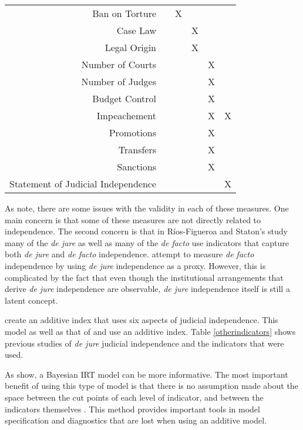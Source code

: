 \documentclass[JohnsonMADraft2.tex]{subfiles}
\begin{document}
\begin{landscape}
\begin{table}[!tbh]
\begin{tabular}{rccccc}
			Ban on Torture	&		&	X	&		&		&		\\
			Case Law	&		&		&	X	&		&		\\
			Legal Origin	&		&		&	X	&		&		\\
			Number of Courts	&		&		&		&	X	&		\\
			Number of Judges	&		&		&		&	X	&		\\
			Budget Control	&		&		&		&	X	&		\\
			Impeachement	&		&		&		&	X	&	X	\\
			Promotions	&		&		&		&	X	&		\\
			Transfers	&		&		&		&	X	&		\\
			Sanctions	&		&		&		&	X	&		\\
			Statement of Judicial Independence	&		&		&		&		&	X	\\\hline
		\end{tabular}
	\end{table}
\end{landscape}
\restoregeometry

\doublespacing\normalsize
As \citet{Rios2014} note, there are some issues with the validity in each of these measures.  One main concern is that some of these measures are not directly related to independence.  The second concern is that in R\'{i}os-Figueroa and Staton's study many of the \textit{de jure} as well as many of the \textit{de facto} use indicators that capture both \textit{de jure} and \textit{de facto} independence.  \citealt{Laporta2004} attempt to measure \textit{de facto} independence by using \textit{de jure} independence as a proxy.  However, this is complicated by the fact that even though the institutional arrangements that derive \textit{de jure} independence are observable, \textit{de jure} independence itself is still a latent concept. 

\citet*{Melton2014} create an additive index that uses six aspects of judicial independence.  This model as well as that of \citet*{Feld2003} and \citet*{Keith2002b} use an additive index.  Table \ref{otherindicators} shows previous studies of \textit{de jure} judicial independence and the indicators that were used.   

As \citet{Linzer2014} show, a Bayesian IRT model can be more informative.  The most important benefit of using this type of model is that there is no assumption made about the space between the cut points of each level of indicator, and between the indicators themselves \citep{Jackman2008,Schnakenberg2014}.  This method provides important tools in model specification and diagnostics that are lost when using an additive model.
\end{document}
